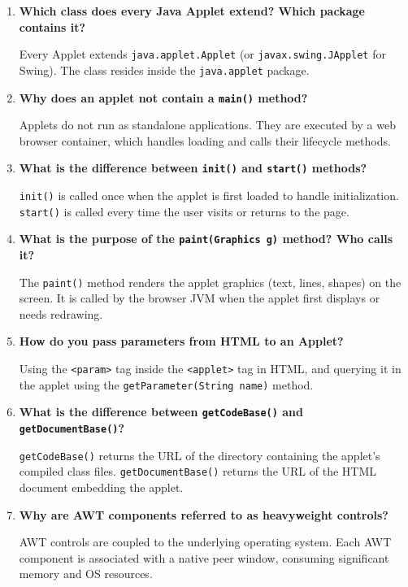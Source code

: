 \documentclass[12pt,a4paper]{article}
\newcommand{\Q}[1]{\textbf{#1}\par\noindent\ignorespaces}
\begin{document}
\begin{tcolorbox}[exambox, title={\textbf{Frequently Asked / Viva Questions}}]
\begin{enumerate}[leftmargin=*, label=\textbf{Q\arabic*.}, itemsep=5pt]
  \item \Q{Which class does every Java Applet extend? Which package contains it?}
        Every Applet extends \texttt{java.applet.Applet} (or \texttt{javax.swing.JApplet} for Swing). The class resides inside the \texttt{java.applet} package.
        
  \item \Q{Why does an applet not contain a \texttt{main()} method?}
        Applets do not run as standalone applications. They are executed by a web browser container, which handles loading and calls their lifecycle methods.
        
  \item \Q{What is the difference between \texttt{init()} and \texttt{start()} methods?}
        \texttt{init()} is called once when the applet is first loaded to handle initialization. \texttt{start()} is called every time the user visits or returns to the page.
        
  \item \Q{What is the purpose of the \texttt{paint(Graphics g)} method? Who calls it?}
        The \texttt{paint()} method renders the applet graphics (text, lines, shapes) on the screen. It is called by the browser JVM when the applet first displays or needs redrawing.
        
  \item \Q{How do you pass parameters from HTML to an Applet?}
        Using the \texttt{<param>} tag inside the \texttt{<applet>} tag in HTML, and querying it in the applet using the \texttt{getParameter(String name)} method.
        
  \item \Q{What is the difference between \texttt{getCodeBase()} and \texttt{getDocumentBase()}?}
        \texttt{getCodeBase()} returns the URL of the directory containing the applet's compiled class files. \texttt{getDocumentBase()} returns the URL of the HTML document embedding the applet.
        
  \item \Q{Why are AWT components referred to as heavyweight controls?}
        AWT controls are coupled to the underlying operating system. Each AWT component is associated with a native peer window, consuming significant memory and OS resources.
        

\end{enumerate}
\end{tcolorbox}
\end{document}
